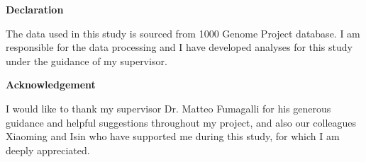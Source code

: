 \cleardoublepage\clearpage



\Large \vspace{1cm}
{\bf Declaration} 
\normalsize \vspace{5mm}

The data used in this study is sourced from 1000 Genome Project database.
I am responsible for the data processing and I have developed analyses for this study under the guidance of my supervisor.


\Large \vspace{1cm}
{\bf Acknowledgement} 
\normalsize \vspace{5mm}

I would like to thank my supervisor Dr. Matteo Fumagalli for his generous guidance and helpful suggestions throughout my project, and also our colleagues Xiaoming and Isin who have supported me during this study, for which I am deeply appreciated.

